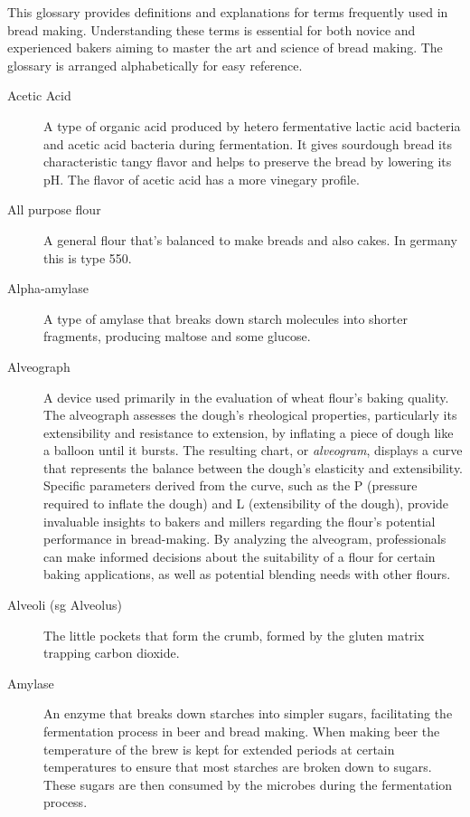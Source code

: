 \begin{quoting}
This glossary provides definitions and explanations for terms frequently
used in bread making. Understanding these terms is essential for both
novice and experienced bakers aiming to master the art and science of
bread making. The glossary is arranged alphabetically for easy reference.
\end{quoting}

\begin{description}

\item[Acetic Acid] A type of organic acid produced by hetero fermentative lactic
acid bacteria and acetic acid bacteria during fermentation. It gives sourdough bread
its characteristic tangy flavor and helps to preserve the bread by lowering its pH.
The flavor of acetic acid has a more vinegary profile.

\item[All purpose flour] A general flour that’s balanced to make breads and also
cakes. In germany this is type 550.

\item[Alpha-amylase] A type of amylase that breaks down starch molecules into
shorter fragments, producing maltose and some glucose.

\item[Alveograph] A device used primarily in the evaluation of wheat flour's
baking quality. The alveograph assesses the dough's rheological properties,
particularly its extensibility and resistance to extension, by inflating a piece
of dough like a balloon until it bursts. The resulting chart, or \emph{alveogram},
displays a curve that represents the balance between the dough's elasticity and
extensibility. Specific parameters derived from the curve, such as the P (pressure
required to inflate the dough) and L (extensibility of the dough), provide invaluable
insights to bakers and millers regarding the flour's potential performance in
bread-making. By analyzing the alveogram, professionals can make informed decisions
about the suitability of a flour for certain baking applications, as well as
potential blending needs with other flours.

\item[Alveoli (sg Alveolus)] The little pockets that form the crumb, formed by
the gluten matrix trapping carbon dioxide.

\item[Amylase] An enzyme that breaks down starches into simpler sugars, facilitating
the fermentation process in beer and bread making. When making beer the temperature
of the brew is kept for extended periods at certain temperatures to ensure that most
starches are broken down to sugars. These sugars are then consumed by the microbes
during the fermentation process.


\end{description}
